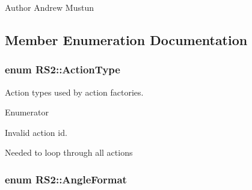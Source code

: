 \begin{DoxyAuthor}{Author}
Andrew Mustun 
\end{DoxyAuthor}


\subsection{Member Enumeration Documentation}
\hypertarget{classRS2_afe3523e0bc41fd637b892321cfc4b9d7}{
\subsubsection[{Action\-Type}]{\setlength{\rightskip}{0pt plus 5cm}enum {\bf R\-S2\-::\-Action\-Type}}}\label{classRS2_afe3523e0bc41fd637b892321cfc4b9d7}
Action types used by action factories. \begin{Desc}
\item[Enumerator]\par
\begin{description}
\item[{\em 
\hypertarget{classRS2_afe3523e0bc41fd637b892321cfc4b9d7a87399b91b144b6e5d53f649422fc00c6}{Action\-None}\label{classRS2_afe3523e0bc41fd637b892321cfc4b9d7a87399b91b144b6e5d53f649422fc00c6}
}]Invalid action id. \item[{\em 
\hypertarget{classRS2_afe3523e0bc41fd637b892321cfc4b9d7a0000b6556bad116f75904e10e64adcdd}{Action\-Last}\label{classRS2_afe3523e0bc41fd637b892321cfc4b9d7a0000b6556bad116f75904e10e64adcdd}
}]Needed to loop through all actions \end{description}
\end{Desc}
\hypertarget{classRS2_a9c7a07b03f910b04154536a28c151277}{
\subsubsection[{Angle\-Format}]{\setlength{\rightskip}{0pt plus 5cm}enum {\bf R\-S2\-::\-Angle\-Format}}}\label{classRS2_a9c7a07b03f910b04154536a28c151277}
